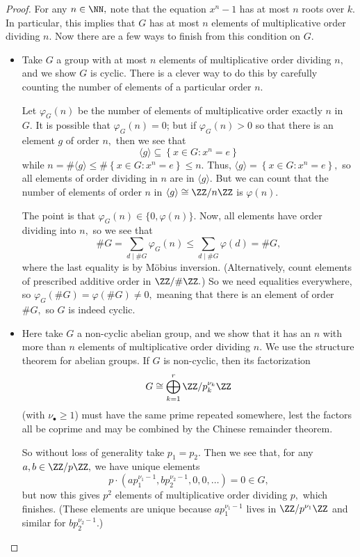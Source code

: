 \begin{proof}
	For any $n\in\NN,$ note that the equation $x^n-1$ has at most $n$ roots over $k.$ In particular, this implies that $G$ has at most $n$ elements of multiplicative order dividing $n.$ Now there are a few ways to finish from this condition on $G.$
	\begin{itemize}
		\item Take $G$ a group with at most $n$ elements of multiplicative order dividing $n,$ and we show $G$ is cyclic. There is a clever way to do this by carefully counting the number of elements of a particular order $n.$
		
		Let $\varphi_G(n)$ be the number of elements of multiplicative order exactly $n$ in $G.$ It is possible that $\varphi_G(n)=0$; but if $\varphi_G(n)>0$ so that there is an element $g$ of order $n,$ then we see that
		\[\langle g\rangle\subseteq\left\{x\in G:x^n=e\right\}\]
		while $n=\#\langle g\rangle\le\#\left\{x\in G:x^n=e\right\}\le n.$ Thus, $\langle g\rangle=\left\{x\in G:x^n=e\right\},$ so all elements of order dividing in $n$ are in $\langle g\rangle.$ But we can count that the number of elements of order $n$ in $\langle g\rangle\cong\ZZ/n\ZZ$ is $\varphi(n).$

		The point is that $\varphi_G(n)\in\{0,\varphi(n)\}.$ Now, all elements have order dividing into $n,$ so we see that
		\[\#G=\sum_{d\mid\#G}\varphi_G(n)\le\sum_{d\mid\#G}\varphi(d)=\#G,\]
		where the last equality is by M\"obius inversion. (Alternatively, count elements of prescribed additive order in $\ZZ/\#\ZZ.$) So we need equalities everywhere, so $\varphi_G(\#G)=\varphi(\#G)\ne0,$ meaning that there is an element of order $\#G,$ so $G$ is indeed cyclic.

		\item Here take $G$ a non-cyclic abelian group, and we show that it has an $n$ with more than $n$ elements of multiplicative order dividing $n.$ We use the structure theorem for abelian groups. If $G$ is non-cyclic, then its factorization
		\[G\cong\bigoplus_{k=1}^r\ZZ/p_k^{\nu_k}\ZZ\]
		(with $\nu_\bullet\ge1$) must have the same prime repeated somewhere, lest the factors all be coprime and may be combined by the Chinese remainder theorem.
		
		So without loss of generality take $p_1=p_2.$ Then we see that, for any $a,b\in\ZZ/p\ZZ,$ we have unique elements
		\[p\cdot\left(ap_1^{\nu_1-1},bp_2^{\nu_2-1},0,0,\ldots\right)=0\in G,\]
		but now this gives $p^2$ elements of multiplicative order dividing $p,$ which finishes. (These elements are unique because $ap_1^{\nu_1-1}$ lives in $\ZZ/p^{\nu_1}\ZZ$ and similar for $bp_2^{\nu_2-1}.$)
		\qedhere
	\end{itemize}
\end{proof}
